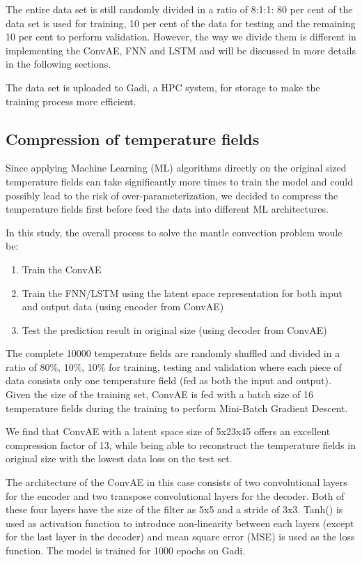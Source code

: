 The entire data set is still randomly divided in a ratio of 8:1:1: 80 per cent of the data set is used for training, 10 per cent of the data for testing and the remaining 10 per cent to perform validation. However, the way we divide them is different in implementing the ConvAE, FNN and LSTM and will be discussed in more details in the following sections.

The data set is uploaded to Gadi, a HPC system, for storage to make the training process more efficient. 

\subsection{Compression of temperature fields}

Since applying Machine Learning (ML) algorithms directly on the original sized temperature fields can take significantly more times to train the model and could possibly lead to the risk of over-parameterization, we decided to compress the temperature fields first before feed the data into different ML architectures.

In this study, the overall process to solve the mantle convection problem woule be: 

\begin{enumerate}
  \item Train the ConvAE
  \item Train the FNN/LSTM using the latent space representation for both input and output data (using encoder from ConvAE)
  \item Test the prediction result in original size (using decoder from ConvAE)
\end{enumerate}

The complete 10000 temperature fields are randomly shuffled and divided in a ratio of 80\%, 10\%, 10\% for training, testing and validation where each piece of data consists only one temperature field (fed as both the input and output). Given the size of the training set, ConvAE is fed with a batch size of 16 temperature fields during the training to perform Mini-Batch Gradient Descent.

We find that ConvAE with a latent space size of 5x23x45 offers an excellent compression factor of 13, while being able to reconstruct the temperature fields in original size with the lowest data loss on the test set.

The architecture of the ConvAE in this case consists of two convolutional layers for the encoder and two transpose convolutional layers for the decoder. Both of these four layers have the size of the filter as 5x5 and a stride of 3x3. Tanh() is used as activation function to introduce non-linearity between each layers (except for the last layer in the decoder) and mean square error (MSE) is used as the loss function. The model is trained for 1000 epochs on Gadi.

